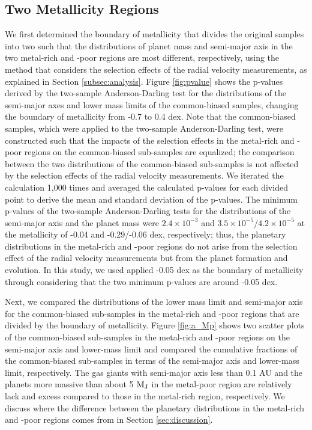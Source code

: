 \documentclass[twocolumn, dvipdfmx]{aastex62}
\begin{document}
\begin{CJK*}{UTF8}{min}
\subsection{Two Metallicity Regions} \label{subsec:metal}

We first determined the boundary of metallicity that divides the original samples into two such that the distributions of planet mass and semi-major axis in the two metal-rich and -poor regions are most different, respectively, using the method that considers the selection effects of the radial velocity measurements, as explained in Section \ref{subsec:analysis}. Figure \ref{fig:pvalue} shows the p-values derived by the two-sample Anderson-Darling test for the distributions of the semi-major axes and lower mass limits of the common-biased samples, changing the boundary of metallicity from -0.7 to 0.4 dex. Note that the common-biased samples, which were applied to the two-sample Anderson-Darling test, were constructed such that the impacts of the selection effects in the metal-rich and -poor regions on the common-biased sub-samples are equalized; the comparison between the two distributions of the common-biased sub-samples is not affected by the selection effects of the radial velocity measurements. We iterated the calculation 1,000 times and averaged the calculated p-values for each divided point to derive the mean and standard deviation of the p-values. The minimum p-values of the two-sample Anderson-Darling tests for the distributions of the semi-major axis and the planet mass were $2.4\times10^{-3}$ and $3.5\times10^{-5}/4.2\times10^{-5}$ at the metallicity of -0.04 and -0.29/-0.06 dex, respectively; thus, the planetary distributions in the metal-rich and -poor regions do not arise from the selection effect of the radial velocity measurements but from the planet formation and evolution. In this study, we used applied -0.05 dex as the boundary of metallicity through considering that the two minimum p-values are around -0.05 dex.

Next, we compared the distributions of the lower mass limit and semi-major axis for the common-biased sub-samples in the metal-rich and -poor regions that are divided by the boundary of metallicity. Figure \ref{fig:a_Mp} shows two scatter plots of the common-biased sub-samples in the metal-rich and -poor regions on the semi-major axis and lower-mass limit and compared the cumulative fractions of the common-biased sub-samples in terms of the semi-major axis and lower-mass limit, respectively. The gas giants with semi-major axis less than 0.1 AU and the planets more massive than about 5 $\rm M_J$ in the metal-poor region are relatively lack and excess compared to those in the metal-rich region, respectively. We discuss where the difference between the planetary distributions in the metal-rich and -poor regions comes from in Section \ref{sec:discussion}.


\end{CJK*}
\end{document}
